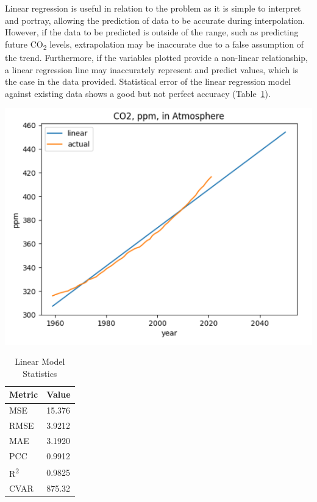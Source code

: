 \documentclass[12pt]{mcmthesis}
\begin{document}
    Linear regression is useful in relation to the problem as it is simple to interpret and portray, allowing the prediction of data to be accurate during interpolation.
    However, if the data to be predicted is outside of the range, such as predicting future CO\textsubscript{2} levels, extrapolation may be inaccurate due to a false assumption of the trend.
    Furthermore, if the variables plotted provide a non-linear relationship, a linear regression line may inaccurately represent and predict values, which is the case in the data provided.
    Statistical error of the linear regression model against existing data shows a good but not perfect accuracy (Table~\ref{tab:co2_lr_err}).

    \begin{table}[h]
        \begin{minipage}{0.7\linewidth}
            \centering
            \includegraphics[width=\textwidth]{linear}%
            \label{fig:co2_lr}
        \end{minipage}%
        \begin{minipage}{0.3\linewidth}
            \centering
            \begin{tabular}{ll}
                \toprule
                Metric               & Value  \\
                \midrule
                MSE                  & 15.376 \\
                RMSE                 & 3.9212 \\
                MAE                  & 3.1920 \\
                PCC                  & 0.9912 \\
                R\textsuperscript{2} & 0.9825 \\
                CVAR                 & 875.32 \\
                \bottomrule
            \end{tabular}
            \vspace{8pt}
            \caption{Linear Model Statistics}
            \label{tab:co2_lr_err}
        \end{minipage}
    \end{table}
\end{document}
